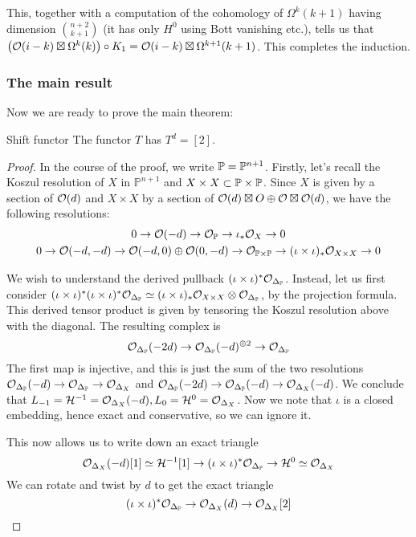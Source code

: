 This, together with a computation of the cohomology of $\Omega^k(k+1)$ having dimension $\binom{n+2}{k+1}$ (it has only $H^0$ using Bott vanishing etc.), tells us that $\big(\O(i-k)\boxtimes \Omega^{k}(k)\big) \circ K_1=\O(i-k)\boxtimes \Omega^{k+1}(k+1)$. This completes the induction.

\subsubsection{The main result}
Now we are ready to prove the main theorem:

\begin{theorem}{Shift functor}{}
    The functor $T$ has $T^d=[2]$.
\end{theorem}

\begin{proof}
    In the course of the proof, we write $\P=\mathbb{P}^{n+1}$. Firstly, let's recall the Koszul resolution of $X$ in $\mathbb{P}^{n+1}$ and $X\times X\subset \P\times \P$. Since $X$ is given by a section of $\O(d)$ and $X\times X$ by a section of $\O(d) \boxtimes O \oplus \O \boxtimes \O(d)$, we have the following resolutions: \begin{gather*}
        0\rightarrow \O(-d)\rightarrow \O_\P \rightarrow \iota_* \O_X\rightarrow 0\\
        0\rightarrow \O(-d,-d)\rightarrow \O(-d,0)\oplus \O(0,-d)\rightarrow \O_{\P\times \P}\rightarrow (\iota\times \iota)_* \O_{X\times X}\rightarrow 0
    \end{gather*}

    We wish to understand the derived pullback $(\iota\times \iota)^* \O_{\Delta_\P} $. Instead, let us first consider $(\iota\times \iota)^*(\iota\times \iota)^* \O_{\Delta_\P} \simeq (\iota\times \iota)_* \O_{X\times X} \otimes \O_{\Delta_\P}$, by the projection formula. This derived tensor product is given by tensoring the Koszul resolution above with the diagonal. The resulting complex is $$\O_{\Delta_\P}(-2d)\rightarrow \O_{\Delta_\P}(-d)^{\oplus 2}\rightarrow \O_{\Delta_\P}$$
    The first map is injective, and this is just the sum of the two resolutions $\O_{\Delta_\P}(-d)\rightarrow \O_{\Delta_\P}\rightarrow \O_{\Delta_X}$ and $\O_{\Delta_\P}(-2d)\rightarrow \O_{\Delta_\P}(-d)\rightarrow \O_{\Delta_X}(-d)$. We conclude that $L_{-1}=\calH^{-1}=\O_{\Delta_X}(-d), L_0=\calH^{0}=\O_{\Delta_X}$. Now we note that $\iota$ is a closed embedding, hence exact and conservative, so we can ignore it.

    This now allows us to write down an exact triangle $$\O_{\Delta_X}(-d)[1]\simeq \calH^{-1}[1]\rightarrow (\iota\times \iota)^*\O_{\Delta_\P}\rightarrow \calH^0\simeq \O_{\Delta_X}$$
    We can rotate and twist by $d$ to get the exact triangle 
    \begin{equation}\label{eqn:derivedtriangle}
        (\iota\times \iota)^*\O_{\Delta_\P}\rightarrow \O_{\Delta_X}(d)\rightarrow \O_{\Delta_X}[2]
    \end{equation}


\end{proof}
